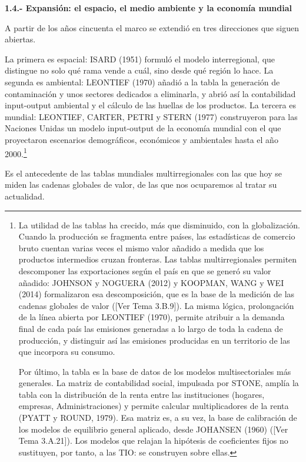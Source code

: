 \documentclass[10pt,a4paper]{article}
\newcommand{\authorfont}[1]{{\fontfamily{EBGaramond-TLF}\selectfont #1}}
\begin{document}
\textbf{1.4.- Expansión: el espacio, el medio ambiente y la economía mundial}

A partir de los años cincuenta el marco se extendió en tres direcciones que siguen abiertas. 

La primera es espacial: ISARD (1951) formuló el modelo interregional, que distingue no solo qué rama vende a cuál, sino desde qué región lo hace. La segunda es ambiental: LEONTIEF (1970) añadió a la tabla la generación de contaminación y unos sectores dedicados a eliminarla, y abrió así la contabilidad input-output ambiental y el cálculo de las huellas de los productos. La tercera es mundial: LEONTIEF, CARTER, PETRI y STERN (1977) construyeron para las Naciones Unidas un modelo input-output de la economía mundial con el que proyectaron escenarios demográficos, económicos y ambientales hasta el año 2000.\footnote{%
  La utilidad de las tablas ha crecido, más que disminuido, con la globalización. Cuando la producción se fragmenta entre países, las estadísticas de comercio bruto cuentan varias veces el mismo valor añadido a medida que los productos intermedios cruzan fronteras. Las tablas multirregionales permiten descomponer las exportaciones según el país en que se generó su valor añadido: JOHNSON y NOGUERA (2012) y KOOPMAN, WANG y WEI (2014) formalizaron esa descomposición, que es la base de la medición de las cadenas globales de valor ([\authorfont{Ver Tema 3.B.9}]). La misma lógica, prolongación de la línea abierta por LEONTIEF (1970), permite atribuir a la demanda final de cada país las emisiones generadas a lo largo de toda la cadena de producción, y distinguir así las emisiones producidas en un territorio de las que incorpora su consumo.

Por último, la tabla es la base de datos de los modelos multisectoriales más generales. La matriz de contabilidad social, impulsada por STONE, amplía la tabla con la distribución de la renta entre las instituciones (hogares, empresas, Administraciones) y permite calcular multiplicadores de la renta (PYATT y ROUND, 1979). Esa matriz es, a su vez, la base de calibración de los modelos de equilibrio general aplicado, desde JOHANSEN (1960) ([\authorfont{Ver Tema 3.A.21}]). Los modelos que relajan la hipótesis de coeficientes fijos no sustituyen, por tanto, a las TIO: se construyen sobre ellas.
} 

Es el antecedente de las tablas mundiales multirregionales con las que hoy se miden las cadenas globales de valor, de las que nos ocuparemos al tratar su actualidad.
\end{document}
